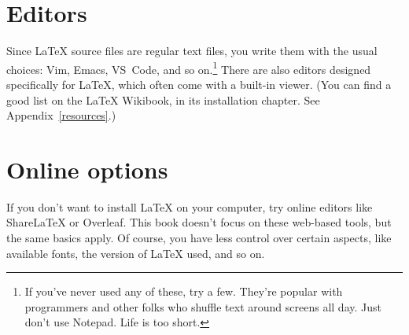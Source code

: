 \section{Editors}

Since \LaTeX{} source files are regular text files,
you write them with the usual choices: Vim, Emacs,
VS~Code, and so on.\punckern\footnote{If you've never used
any of these, try a few.
They're popular with programmers and other folks who shuffle text around
screens all day. Just don't use Notepad. Life is too short.}
There are also editors designed specifically for \LaTeX{},
which often come with a built-in  viewer.
(You can find a good list on the \LaTeX{} Wikibook,
in its installation chapter. See Appendix~\ref{resources}.)

\section{Online options}

If you don't want to install \LaTeX{} on your computer,
try online editors like Share\LaTeX{} or Overleaf.
This book doesn't focus on these web-based tools,
but the same basics apply.
Of course, you have less control over certain aspects,
like available fonts, the version of \LaTeX{} used, and so on.

